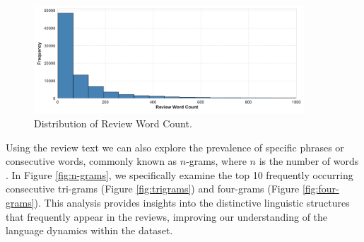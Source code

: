 \begin{figure}[h]
  \centering
  \includegraphics[width=0.9\textwidth]{Figures/distribution_of_review_word_count.pdf} %
  \caption{Distribution of Review Word Count.}
  \label{fig:distribution of word count}
\end{figure}

Using the review text we can also explore the prevalence of specific phrases or consecutive words, commonly known as $n$-grams, where $n$ is the number of words \cite{mcauley2013hidden}. In Figure \ref{fig:n-grams}, we specifically examine the top 10 frequently occurring consecutive tri-grams (Figure \ref{fig:trigrams}) and four-grams (Figure \ref{fig:four-grams}). This analysis provides insights into the distinctive linguistic structures that frequently appear in the reviews, improving our understanding of the language dynamics within the dataset.

